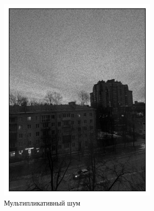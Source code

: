 \documentclass[a4paper,12pt]{article}
\begin{document}
\begin{figure}[H]
\begin{minipage}{0.49\textwidth}
        \centering \includegraphics[width=\textwidth]{results/speckle.png}
        \caption{Мультипликативный шум}
    \end{minipage}
\end{figure}
\end{document}
